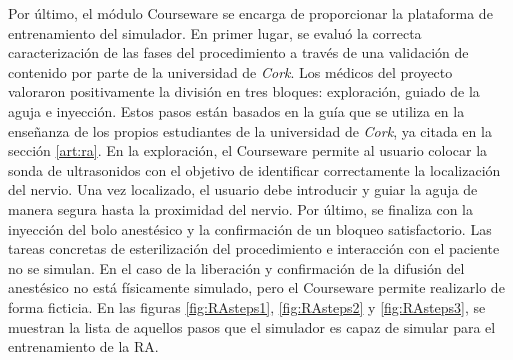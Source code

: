 Por último, el módulo \ac{Courseware} se encarga de proporcionar la plataforma de entrenamiento del simulador.
En primer lugar, se evaluó la correcta caracterización de las fases del procedimiento a través de una validación de contenido por parte de la universidad de \emph{Cork}. Los médicos del proyecto valoraron positivamente la división en tres bloques: exploración, guiado de la aguja e inyección. Estos pasos están basados en la guía que se utiliza en la enseñanza de los propios estudiantes de la universidad de \emph{Cork}, ya citada en la sección \ref{art:ra}. En la exploración, el \ac{Courseware} permite al usuario colocar la sonda de ultrasonidos con el objetivo de identificar correctamente la localización del nervio. Una vez localizado, el usuario debe introducir y guiar la aguja de manera segura hasta la proximidad del nervio. Por último, se finaliza con la inyección del bolo anestésico y la confirmación de un bloqueo satisfactorio. Las tareas concretas de esterilización del procedimiento e interacción con el paciente no se simulan. En el caso de la liberación y  confirmación de la difusión del anestésico no está físicamente simulado, pero el \ac{Courseware} permite realizarlo de forma ficticia. En las figuras \ref{fig:RAsteps1}, \ref{fig:RAsteps2} y \ref{fig:RAsteps3}, se muestran la lista de aquellos pasos que el simulador es capaz de simular para el entrenamiento de la \ac{RA}.



